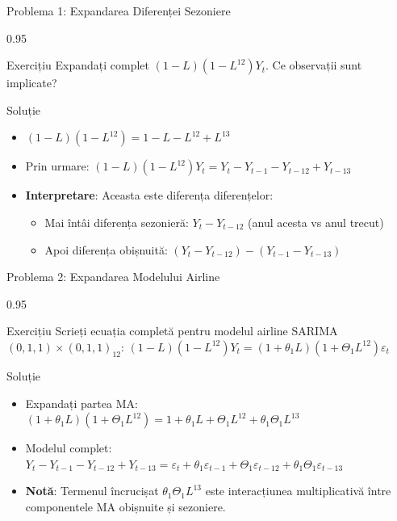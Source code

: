 \documentclass[9pt, aspectratio=169, t]{beamer}
\begin{document}
\begin{frame}{Problema 1: Expandarea Diferenței Sezoniere}
    \begin{cminipage}{0.95\textwidth}
    \begin{block}{Exercițiu}
        Expandați complet $(1-L)(1-L^{12})Y_t$. Ce observații sunt implicate?
    \end{block}

    \vspace{0.3cm}
    \pause
    \begin{exampleblock}{Soluție}
        \begin{itemize}\setlength{\itemsep}{0pt}
        \item $(1-L)(1-L^{12}) = 1 - L - L^{12} + L^{13}$
        \item Prin urmare:
        $(1-L)(1-L^{12})Y_t = Y_t - Y_{t-1} - Y_{t-12} + Y_{t-13}$
        \item \textbf{Interpretare}: Aceasta este diferența diferențelor:
        \begin{itemize}\setlength{\itemsep}{0pt}
            \item Mai întâi diferența sezonieră: $Y_t - Y_{t-12}$ (anul acesta vs anul trecut)
            \item Apoi diferența obișnuită: $(Y_t - Y_{t-12}) - (Y_{t-1} - Y_{t-13})$
        \end{itemize}
        \end{itemize}
    \end{exampleblock}
    \end{cminipage}
\end{frame}

\begin{frame}{Problema 2: Expandarea Modelului Airline}
    \begin{cminipage}{0.95\textwidth}
    \begin{block}{Exercițiu}
        Scrieți ecuația completă pentru modelul airline SARIMA$(0,1,1) \times (0,1,1)_{12}$:
        $(1-L)(1-L^{12})Y_t = (1+\theta_1 L)(1+\Theta_1 L^{12})\varepsilon_t$
    \end{block}

    \vspace{0.2cm}
    \pause
    \begin{exampleblock}{Soluție}
        \begin{itemize}\setlength{\itemsep}{0pt}
        \item Expandați partea MA:
        $(1+\theta_1 L)(1+\Theta_1 L^{12}) = 1 + \theta_1 L + \Theta_1 L^{12} + \theta_1 \Theta_1 L^{13}$
        \item Modelul complet:
        $Y_t - Y_{t-1} - Y_{t-12} + Y_{t-13} = \varepsilon_t + \theta_1 \varepsilon_{t-1} + \Theta_1 \varepsilon_{t-12} + \theta_1 \Theta_1 \varepsilon_{t-13}$
        \item \textbf{Notă}: Termenul încrucișat $\theta_1 \Theta_1 L^{13}$ este interacțiunea multiplicativă între componentele MA obișnuite și sezoniere.
        \end{itemize}
    \end{exampleblock}
    \end{cminipage}
\end{frame}
\end{document}
